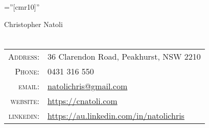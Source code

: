 \documentclass[10pt]{article}
\begin{document}

\pagestyle{empty} %

\font\fb=''[cmr10]'' %

\par{\centering
		{\Huge Christopher Natoli
	}\bigskip\par}

\vspace*{-0.6cm}
\section{}

\begin{tabular}{rl}
    \textsc{Address:}   & 36 Clarendon Road, Peakhurst, NSW 2210\\
    \textsc{Phone:}     & 0431 316 550\\
    \textsc{email:}     & \href{natolichris@gmail.com}{natolichris@gmail.com} \\
    \textsc{website:} & \href{https://cnatoli.com}{https://cnatoli.com}\\
    \textsc{linkedin:} & \href{https://au.linkedin.com/in/natolichris}{https://au.linkedin.com/in/natolichris} \\
\end{tabular}
\vspace*{0.3cm}
\end{document}
